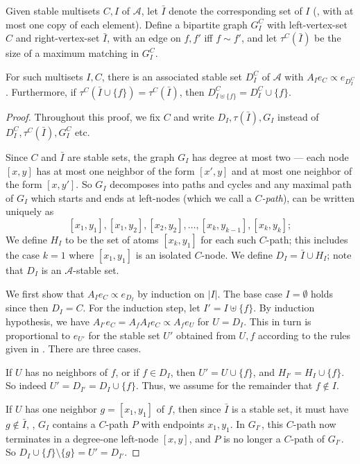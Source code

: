 \documentclass{toc}
\begin{document}
\begin{proposition}
\label{add-active-prop}
Given stable multisets $C, I$ of $\mathcal A$, let $\bar I$ denote the corresponding set of $I$ (\ie, with at most one copy of each element).  Define a bipartite graph $G^C_{I}$ with left-vertex-set $C$ and right-vertex-set  $\bar I$, with an edge on $f, f'$ iff $f \sim f'$, and let $\tau^{C}(\bar I)$ be the size of a maximum matching in $G^C_{I}$.   

For such multisets $I, C$, there is an associated stable set $D^C_{I}$ of $\mathcal A$ with  $A_I e_C \propto e_{D^C_{I}}$. Furthermore, if $\tau^C(\bar I \cup \{f \}) = \tau^C(\bar I)$, then $D^C_{I \uplus \{f \}} = D^C_{I} \cup \{ f \}$.
\end{proposition}
\begin{proof}
Throughout this proof, we fix $C$ and write $D_I, \tau(\bar I), G_I$ instead of $D^C_{I}, \tau^C(\bar I), G^C_{I}$ etc.

Since $C$ and $\bar I$ are stable sets, the graph $G_{I}$ has degree at most two ---  each node $[x,y]$ has at most one neighbor of the form $[x', y]$ and at most one neighbor of the form $[x, y']$. So $G_{I}$ decomposes into paths and cycles and any maximal path of $G_I$ which starts and ends at left-nodes (which we call a \emph{$C$-path}), can be written uniquely as
$$
[x_1, y_1], [x_1, y_2], [x_2, y_2], \dots, [x_k, y_{k-1}], [x_k, y_k];
$$
We define $H_I$ to be the set of atoms $[x_k, y_1]$ for each such $C$-path; this includes the case $k = 1$ where $[x_1, y_1]$ is an isolated $C$-node. We define $D_I = \bar I \cup H_I$; note that $D_I$ is an $\mathcal A$-stable set.

We first show that $A_I e_C \propto e_{D_{I}}$ by  induction on $|I|$. The base case $I =\emptyset$ holds since then $D_{I} = C$. For the induction step, let $I' = I \uplus \{f \}$. By induction hypothesis, we have $A_{I'} e_C = A_f A_{I} e_C \propto A_f e_{U}$ for $U = D_{I}$. This in turn is proportional to $e_{ U' }$ for the stable set $U'$ obtained from $U, f$ according to the rules given in . There are three cases.

 If $U$ has no neighbors of $f$, or if $f \in D_I$, then $U' = U \cup \{f \}$,  and $H_{I'} = H_{I} \cup \{f \}$. So indeed $U' =  D_{I'} = D_I \cup \{ f \}$. Thus, we assume for the remainder that $f \notin I$.

 If $U$ has one neighbor $g = [x_1, y_1]$ of $f$, then since $\bar I$ is a stable set, it must have $g \notin \bar I$, \ie, $G_{I}$ contains a $C$-path $P$ with endpoints $x_1, y_1$. In $G_{I'}$, this $C$-path now terminates in a degree-one left-node $[x, y]$, and $P$ is no longer a $C$-path of $G_{I'}$. So $D_{I} \cup \{f \} \setminus \{ g \} = U' = D_{I'}$.


\end{proof}
\end{document}
